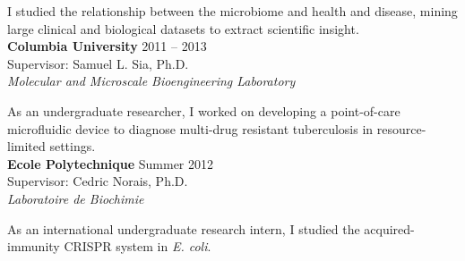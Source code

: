 \documentclass[10pt]{article}
\newenvironment{innerlist}[1][\enskip\textbullet]%
        {\begin{itemize}[#1,leftmargin=*,parsep=0pt,itemsep=0pt,topsep=0pt,partopsep=0pt]}
        {\end{itemize}}
\begin{document}
I studied the relationship between the microbiome and health and disease, mining large clinical and biological datasets to extract scientific insight. \\

\textbf{Columbia University} \hfill {2011 -- 2013} \\
Supervisor: Samuel L. Sia, Ph.D. \\
\textit{Molecular and Microscale Bioengineering Laboratory}
	\vspace{0.08in}

As an undergraduate researcher, I worked on developing a point-of-care microfluidic device to diagnose multi-drug resistant tuberculosis in resource-limited settings.  \\

\textbf{Ecole Polytechnique} \hfill {Summer 2012} \\
Supervisor: Cedric Norais, Ph.D. \\
\textit{Laboratoire de Biochimie}
	\vspace{0.08in}

As an international undergraduate research intern, I studied the acquired-immunity CRISPR system in \textit{E. coli}. 


%
\end{document}
